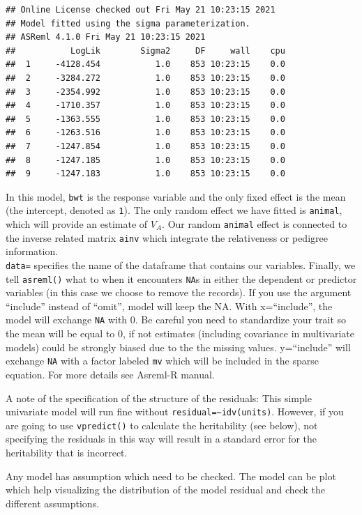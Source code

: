 \documentclass[
  12pt,
]{book}
\begin{document}
\begin{verbatim}
## Online License checked out Fri May 21 10:23:15 2021
## Model fitted using the sigma parameterization.
## ASReml 4.1.0 Fri May 21 10:23:15 2021
##           LogLik        Sigma2     DF     wall    cpu
##  1     -4128.454           1.0    853 10:23:15    0.0
##  2     -3284.272           1.0    853 10:23:15    0.0
##  3     -2354.992           1.0    853 10:23:15    0.0
##  4     -1710.357           1.0    853 10:23:15    0.0
##  5     -1363.555           1.0    853 10:23:15    0.0
##  6     -1263.516           1.0    853 10:23:15    0.0
##  7     -1247.854           1.0    853 10:23:15    0.0
##  8     -1247.185           1.0    853 10:23:15    0.0
##  9     -1247.183           1.0    853 10:23:15    0.0
\end{verbatim}

In this model, \texttt{bwt} is the response variable and the only fixed effect is the mean (the intercept, denoted as \texttt{1}). The only random effect we have fitted is \texttt{animal}, which will provide an estimate of \(V_A\). Our random \texttt{animal} effect is connected to the inverse related matrix \texttt{ainv} which integrate the relativeness or pedigree information.\\
\texttt{data=} specifies the name of the dataframe that contains our variables. Finally, we tell \texttt{asreml()} what to when it encounters \texttt{NA}s in either the dependent or predictor variables (in this case we choose to remove the records). If you use the argument ``include'' instead of ``omit'', model will keep the NA. With x=``include'', the model will exchange \texttt{NA} with 0. Be careful you need to standardize your trait so the mean will be equal to 0, if not estimates (including covariance in multivariate models) could be strongly biased due to the the missing values. y=``include'' will exchange \texttt{NA} with a factor labeled \texttt{mv} which will be included in the sparse equation. For more details see Asreml-R manual.

A note of the specification of the structure of the residuals: This simple univariate model will run fine without \texttt{residual=\textasciitilde{}idv(units)}. However, if you are going to use \texttt{vpredict()} to calculate the heritability (see below), not specifying the residuals in this way will result in a standard error for the heritability that is incorrect.

Any model has assumption which need to be checked. The model can be plot which help visualizing the distribution of the model residual and check the different assumptions.
\end{document}
